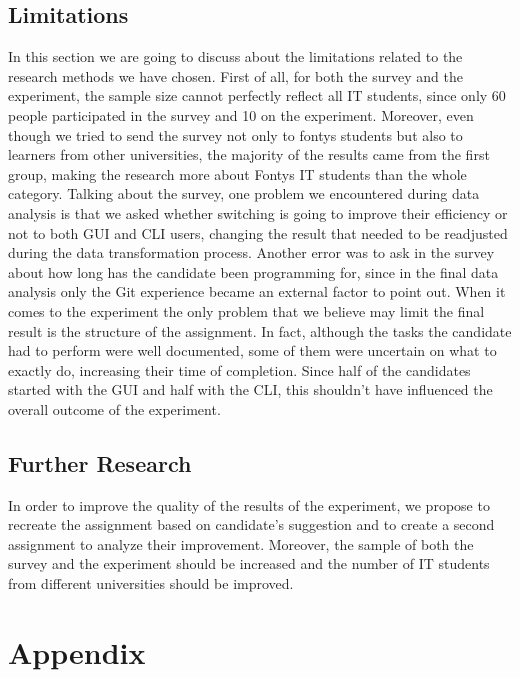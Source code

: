 \documentclass[]{report}
\begin{document}
	\subsection{Limitations}
	In this section we are going to discuss about the limitations related to the research methods we have chosen.
	First of all, for both the survey and the experiment, the sample size cannot perfectly reflect all IT students, since only 60 people participated in the survey and 10 on the experiment.
	Moreover, even though we tried to send the survey not only to fontys students but also to learners from other universities, the majority of the results came from the first group, making the research more about Fontys IT students than the whole category.
	Talking about the survey, one problem we encountered during data analysis is that we asked whether switching is going to improve their efficiency or not to both GUI and CLI users, changing the result that needed to be readjusted during the data transformation process. Another error was to ask in the survey about how long has the candidate been programming for, since in the final data analysis only the Git experience became an external factor to point out.
	When it comes to the experiment the only problem that we believe may limit the final result is the structure of the assignment. In fact, although the tasks the candidate had to perform were well documented, some of them were uncertain on what to exactly do, increasing their time of completion. Since half of the candidates started with the GUI and half with the CLI, this shouldn't have influenced the overall outcome of the experiment.
	\subsection{Further Research}
	In order to improve the quality of the results of the experiment, we propose to recreate the assignment based on candidate's suggestion and to create a second assignment to analyze their improvement. Moreover, the sample of both the survey and the experiment should be increased and the number of IT students from different universities should be improved. \newpage
	

	
	\section{Appendix}
	
	
	
\end{document}

